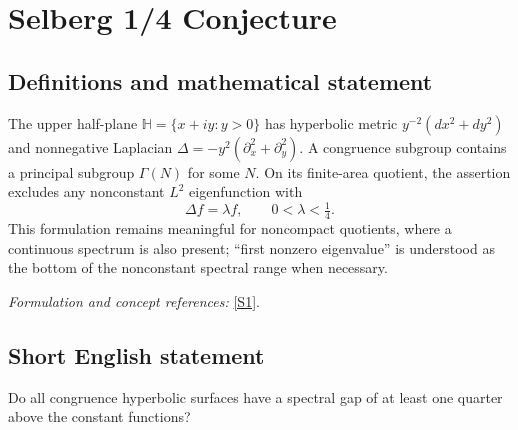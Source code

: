 \documentclass[11pt]{article}
\newcommand{\sref}[2]{\hyperlink{source:#1:#2}{[S#2]}}
\newif\ifshowcatalogue
\newcommand{\cataloguescope}[1]{\ifshowcatalogue
 \paragraph{Exact scope in the supplied catalogue.}
 \begin{quote}\small #1\end{quote}\fi}
\begin{document}
\setcounter{section}{100}
\clearpage
\section{\texorpdfstring{Selberg 1/4 Conjecture}{Selberg 1/4 Conjecture}}\label{101}
\subsection{Definitions and mathematical statement}
The upper half-plane $\mathbb H=\{x+iy:y>0\}$ has hyperbolic metric $y^{-2}(dx^2+dy^2)$ and nonnegative Laplacian $\Delta=-y^2(\partial_x^2+\partial_y^2)$. A congruence subgroup contains a principal subgroup $\Gamma(N)$ for some $N$. On its finite-area quotient, the assertion excludes any nonconstant $L^2$ eigenfunction with
\[
 \Delta f=\lambda f,\qquad0<\lambda<\tfrac14.
\]
This formulation remains meaningful for noncompact quotients, where a continuous spectrum is also present; ``first nonzero eigenvalue'' is understood as the bottom of the nonconstant spectral range when necessary.
\par\smallskip\textit{Formulation and concept references:} \sref{101}{1}.
\cataloguescope{Prove that the first nonzero eigenvalue lambda\_1 of the Laplace-Beltrami operator on every congruence quotient of the upper half-plane is at least 1/4.}
\subsection{Short English statement}
Do all congruence hyperbolic surfaces have a spectral gap of at least one quarter above the constant functions?
\end{document}
